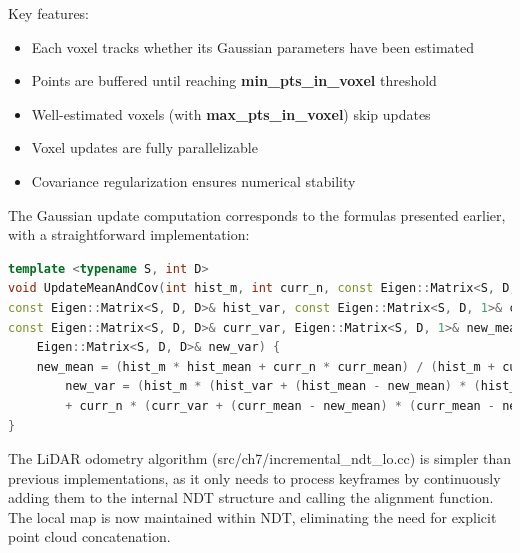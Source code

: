 Key features:
\begin{itemize}
	\item Each voxel tracks whether its Gaussian parameters have been estimated
	\item Points are buffered until reaching \textbf{min\_pts\_in\_voxel} threshold
	\item Well-estimated voxels (with \textbf{max\_pts\_in\_voxel}) skip updates
	\item Voxel updates are fully parallelizable
	\item Covariance regularization ensures numerical stability
\end{itemize}

The Gaussian update computation corresponds to the formulas presented earlier, with a straightforward implementation:

\begin{lstlisting}[language=c++,caption=src/common/math\_utils.h]
template <typename S, int D>
void UpdateMeanAndCov(int hist_m, int curr_n, const Eigen::Matrix<S, D, 1>& hist_mean,
const Eigen::Matrix<S, D, D>& hist_var, const Eigen::Matrix<S, D, 1>& curr_mean,
const Eigen::Matrix<S, D, D>& curr_var, Eigen::Matrix<S, D, 1>& new_mean,
	Eigen::Matrix<S, D, D>& new_var) {
	new_mean = (hist_m * hist_mean + curr_n * curr_mean) / (hist_m + curr_n);
		new_var = (hist_m * (hist_var + (hist_mean - new_mean) * (hist_mean - new_mean).transpose()) 
		+ curr_n * (curr_var + (curr_mean - new_mean) * (curr_mean - new_mean).transpose()))	/ (hist_m + curr_n);
}
\end{lstlisting}

The LiDAR odometry algorithm (src/ch7/incremental\_ndt\_lo.cc) is simpler than previous implementations, as it only needs to process keyframes by continuously adding them to the internal NDT structure and calling the alignment function. The local map is now maintained within NDT, eliminating the need for explicit point cloud concatenation.


